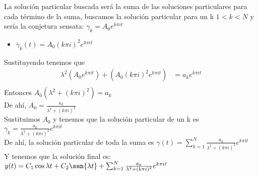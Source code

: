 \documentclass{article}
\begin{document}
\begin{enumerate}
{            La solución particular buscada será la suma de las soluciones particulares para cada término de la suma, buscamos la solución particular para un k $1<k<N$ y sería la conjetura sensata: $\gamma_k = A_0 e^{k \pi i t}$\\
            
            \begin{itemize}
            	\item $\ddot \gamma_k(t)= A_0 (k \pi i)^2e^{k \pi i t} $
            \end{itemize}
        
         Sustituyendo tenemos que
        \begin{align*}
        \lambda^2 (A_0 e^{k \pi i t}) + (A_0 (k \pi i)^2e^{k \pi i t}) &= a_ke^{k \pi i t} \\[0.2cm]
        \end{align*}
        Entonces $A_0 (\lambda^2 + (k \pi i)^2) = a_k$ \\[0.2cm]
        De ahí, $A_0 = \frac{a_k}{\lambda^2 + (k \pi i)^2}$\\
        Sustituimos $A_0$ y tenemos que la solución particular de un k es  $\gamma_k = \frac{a_k}{\lambda^2 + (k \pi i)^2} e^{k \pi i t}$\\
        
        De ahí, la solución particular de toda la suma es $\gamma (t) = \sum_{k=1}^{N} \frac{a_k}{\lambda^2 + (k \pi i)^2} e^{k \pi i t} $\\
        
        Y tenemos que la solución final es: $y(t) = C_1\cos{\lambda t}+C_2\sen{\lambda t} + \sum_{k=1}^{N} \frac{a_k}{\lambda^2 + (k \pi i)^2} e^{k \pi i t}$ \\
         
        }
    \end{enumerate}
\end{document}
